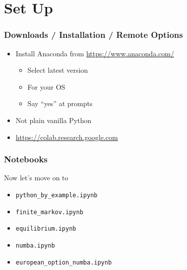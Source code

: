 \section{Set Up}







\begin{frame}
    \frametitle{Downloads / Installation / Remote Options}

    
    \begin{itemize}
        \item Install Anaconda from {\footnotesize \url{https://www.anaconda.com/}}
        \vspace{0.5em}
            \begin{itemize}
                \item Select latest version 
                \item For your OS
                \item Say ``yes'' at prompts
            \end{itemize}
        \vspace{0.5em}
        \item Not plain vanilla Python
    \end{itemize}


    \vspace{1em}


    \begin{itemize}
        \item \url{https://colab.research.google.com}
    \end{itemize}


\end{frame}



\begin{frame}
    \frametitle{Notebooks}

    Now let's move on to
    \begin{itemize}
        \item \texttt{python\_by\_example.ipynb}
        \item \texttt{finite\_markov.ipynb}
        \item \texttt{equilibrium.ipynb}
        \item \texttt{numba.ipynb}
        \item \texttt{european\_option\_numba.ipynb}
    \end{itemize}

\end{frame}








